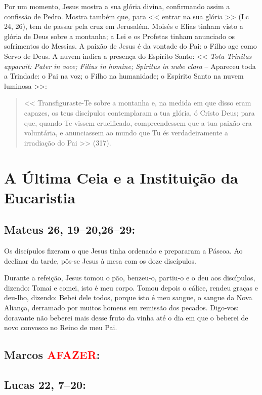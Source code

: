 \documentclass[10pt,a5paper]{book}
\newcommand{\from}[1]{\subsection*{#1}}
\newcommand{\TODO}{\textcolor{red}{\ttfamily AFAZER}}
\begin{document}
Por um momento, Jesus mostra a sua glória divina, confirmando assim a confissão de Pedro. Mostra também que, para << entrar na sua glória >> (Lc 24, 26), tem de passar pela cruz em Jerusalém. Moisés e Elias tinham visto a glória de Deus sobre a montanha; a Lei e os Profetas tinham anunciado os sofrimentos do Messias. A paixão de Jesus é da vontade do Pai: o Filho age como Servo de Deus. A nuvem indica a presença do Espírito Santo: << \emph{Tota Trinitas apparuit: Pater in voce; Filius in homine; Spiritus in nube clara} -- Apareceu toda a Trindade: o Pai na voz; o Filho na humanidade; o Espírito Santo na nuvem luminosa >>:
\begin{quote}
<< Transfiguraste-Te sobre a montanha e, na medida em que disso eram capazes, os teus discípulos contemplaram a tua glória, ó Cristo Deus; para que, quando Te vissem crucificado, compreendessem que a tua paixão era voluntária, e anunciassem ao mundo que Tu és verdadeiramente a irradiação do Pai >> (317).
\end{quote}


\section{A Última Ceia e a Instituição da Eucaristia}

\from{Mateus 26, 19--20,26--29:}

Os discípulos fizeram o que Jesus tinha ordenado e prepararam a Páscoa.
Ao declinar da tarde, pôs-se Jesus à mesa com os doze discípulos.

Durante a refeição, Jesus tomou o pão, benzeu-o, partiu-o e o deu aos discípulos, dizendo: Tomai e comei, isto é meu corpo.
Tomou depois o cálice, rendeu graças e deu-lho, dizendo: Bebei dele todos,
porque isto é meu sangue, o sangue da Nova Aliança, derramado por muitos homens em remissão dos pecados.
Digo-vos: doravante não beberei mais desse fruto da vinha até o dia em que o beberei de novo convosco no Reino de meu Pai.

\from{Marcos \TODO:}

\from{Lucas 22, 7--20:}
\end{document}
